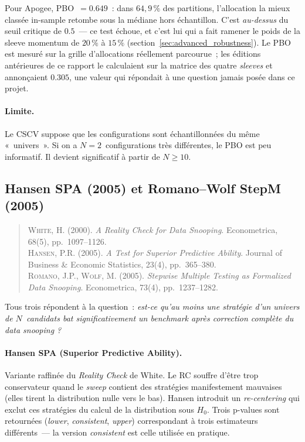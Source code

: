 Pour Apogee, PBO~$= 0.649$~: dans $64{,}9\,\%$ des partitions, l'allocation la mieux classée in-sample retombe sous la médiane hors échantillon. C'est \emph{au-dessus} du seuil critique de $0.5$~--- ce test échoue, et c'est lui qui a fait ramener le poids de la sleeve momentum de $20\,\%$ à $15\,\%$ (section~\ref{sec:advanced_robustness}). Le PBO est mesuré sur la grille d'allocations réellement parcourue~; les éditions antérieures de ce rapport le calculaient sur la matrice des quatre \emph{sleeves} et annonçaient $0.305$, une valeur qui répondait à une question jamais posée dans ce projet.

\paragraph{Limite.} Le CSCV suppose que les configurations sont échantillonnées du même «~univers~». Si on a $N = 2$~configurations très différentes, le PBO est peu informatif. Il devient significatif à partir de $N \geq 10$.

\subsection{Hansen SPA (2005) et Romano--Wolf StepM (2005)}
\label{app:spa_stepm}

\begin{quote}\small
\textsc{White}, H. (2000). \emph{A Reality Check for Data Snooping}. Econometrica, 68(5), pp.~1097--1126.\\
\textsc{Hansen}, P.R. (2005). \emph{A Test for Superior Predictive Ability}. Journal of Business \& Economic Statistics, 23(4), pp.~365--380.\\
\textsc{Romano}, J.P., \textsc{Wolf}, M. (2005). \emph{Stepwise Multiple Testing as Formalized Data Snooping}. Econometrica, 73(4), pp.~1237--1282.
\end{quote}

Tous trois répondent à la question~: \emph{est-ce qu'au moins une stratégie d'un univers de $N$~candidats bat significativement un benchmark après correction complète du data snooping ?}

\paragraph{Hansen SPA (Superior Predictive Ability).} Variante raffinée du \emph{Reality Check} de White. Le RC souffre d'être trop conservateur quand le \emph{sweep} contient des stratégies manifestement mauvaises (elles tirent la distribution nulle vers le bas). Hansen introduit un \emph{re-centering} qui exclut ces stratégies du calcul de la distribution sous $H_{0}$. Trois p-values sont retournées (\emph{lower}, \emph{consistent}, \emph{upper}) correspondant à trois estimateurs différents~--- la version \emph{consistent} est celle utilisée en pratique.

